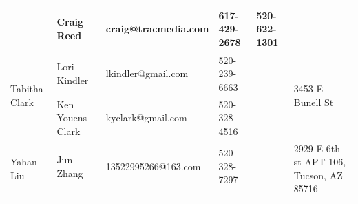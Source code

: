 \documentclass[landscape]{article}\usepackage[]{graphicx}\usepackage[]{color}
\begin{document}
\begin{longtable}{|p{100pt}|p{100pt}|p{140pt}|p{60pt}|p{64pt}|p{120pt}|}
 & Craig Reed & craig@tracmedia.com & 617-429-2678 & 520-622-1301 & \\
\hline
\multirow{2}{100pt}{Tabitha Clark} & Lori Kindler & lkindler@gmail.com & 520-239-6663 &  & \multirow{2}{120pt}{3453 E Bunell St} \\
 & Ken Youens-Clark & kyclark@gmail.com & 520-328-4516 &  & \\
\hline
\multirow{2}{100pt}{Yahan Liu} & Jun Zhang & 13522995266@163.com & 520-328-7297 &  & \multirow{2}{120pt}{2929 E 6th st APT 106, Tucson, AZ 85716} \\
 &  &  &  &  & \\
\hline
\end{longtable}
\newpage

\hline
\end{document}
